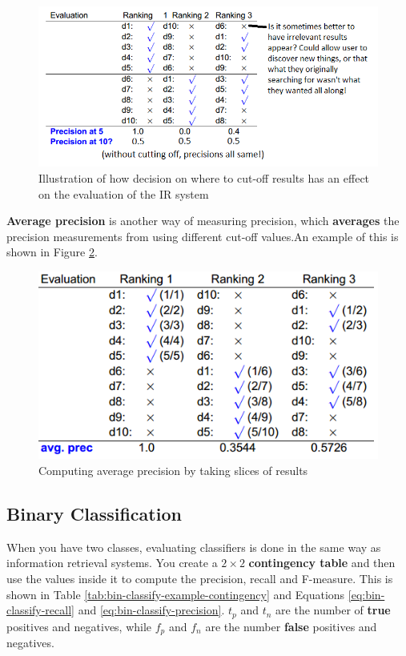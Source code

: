 \documentclass{article}
\begin{document}
\begin{figure}[H]
	\centering
	\includegraphics[scale=0.4]{figures/precision-cutoff.png}
	\caption{Illustration of how decision on where to cut-off results has an effect on the evaluation of the IR system}
	\label{fig:precision-cutoff}
\end{figure}

\textbf{Average precision} is another way of measuring precision, which \textbf{averages} the precision measurements from using different cut-off values.An example of this is shown in Figure \ref{fig:average-precision}.

\begin{figure}[H]
	\centering
	\includegraphics[scale=0.4]{figures/average-precision.png}
	\caption{Computing average precision by taking slices of results}
	\label{fig:average-precision}
\end{figure}

\subsection{Binary Classification}

When you have two classes, evaluating classifiers is done in the same way as information retrieval systems. You create a $2 \times 2$ \textbf{contingency table} and then use the values inside it to compute the precision, recall and F-measure. This is shown in Table \ref{tab:bin-classify-example-contingency} and Equations \ref{eq:bin-classify-recall} and \ref{eq:bin-classify-precision}. $t_p$ and $t_n$ are the number of \textbf{true} positives and negatives, while $f_p$ and $f_n$ are the number \textbf{false} positives and negatives.
\end{document}
